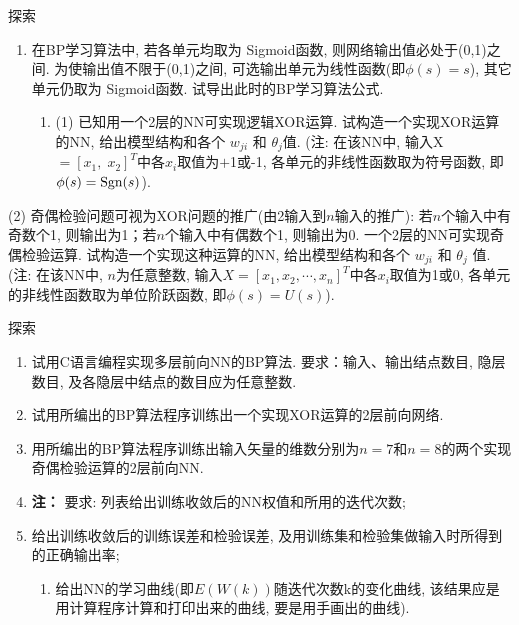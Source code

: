 \begin{custom}[explorecolor]{探索}
\begin{enumerate}
\item 在BP学习算法中, 若各单元均取为 Sigmoid函数, 则网络输出值必处于(0,1)之间. 为使输出值不限于(0,1)之间, 可选输出单元为线性函数(即$\phi(s)=s$), 其它单元仍取为 Sigmoid函数. 试导出此时的BP学习算法公式.
	\begin{enumerate}
	\item (1) 已知用一个2层的NN可实现逻辑XOR运算. 试构造一个实现XOR运算的NN, 给出模型结构和各个 $w_{ji} $ 和 $\theta_{j}$值. (注: 在该NN中, 输入X $=[x_{1} ,\;x_{2} ]^{T}$中各$x_{i} $取值为$+$1或-1, 各单元的非线性函数取为符号函数, 即$\phi(s)=\textup{Sgn}(s)$).
	\end{enumerate}
\end{enumerate}
(2) 奇偶检验问题可视为XOR问题的推广(由2输入到$n$输入的推广): 若$n$个输入中有奇数个1, 则输出为1；若$n$个输入中有偶数个1, 则输出为0. 一个2层的NN可实现奇偶检验运算. 试构造一个实现这种运算的NN, 给出模型结构和各个
$w_{ji} $ 和 $\theta_{j}$ 值. (注: 在该NN中, $n$为任意整数, 输入$X=[x_{1} , x_{2} ,\cdots, x_{n} ]^{T}$中各$x_{i}$取值为1或0, 各单元的非线性函数取为单位阶跃函数, 即$\phi(s)=U(s)$).
\end{custom}
\begin{custom}[explorecolor]{探索}
\begin{enumerate}
\item 试用C语言编程实现多层前向NN的BP算法. 要求：输入、输出结点数目, 隐层数目, 及各隐层中结点的数目应为任意整数.
\item 试用所编出的BP算法程序训练出一个实现XOR运算的2层前向网络.
\item 用所编出的BP算法程序训练出输入矢量的维数分别为$n=7$和$n=8$的两个实现奇偶检验运算的2层前向NN.
\item[\textbullet] \textbf{注： }要求: 列表给出训练收敛后的NN权值和所用的迭代次数;
\item 给出训练收敛后的训练误差和检验误差, 及用训练集和检验集做输入时所得到的正确输出率;
	\begin{enumerate}
	   \item 给出NN的学习曲线(即$E(W(k))$随迭代次数k的变化曲线, 该结果应是用计算程序计算和打印出来的曲线, 要是用手画出的曲线).
	\end{enumerate}
\end{enumerate}
\end{custom}
